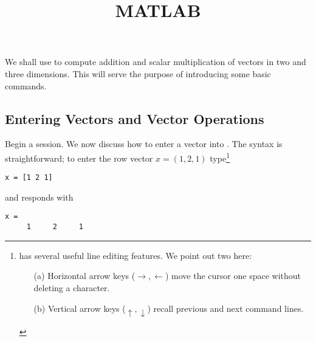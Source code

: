 \documentclass{ximera}
\title{MATLAB}
\begin{document}
\begin{abstract}
\end{abstract}
\maketitle


\label{S:1.2}

We shall use \Matlab to compute addition and scalar
multiplication of vectors in two and three dimensions.  This
will serve the purpose of introducing some basic \Matlab
commands.

\subsection*{Entering Vectors and Vector Operations}

Begin a \Matlab session.  We now discuss how to enter a vector
into \Matlabp.  The syntax is straightforward; to enter the row
vector $x=(1,2,1)$ type\footnote{\Matlab has several useful line
editing features.  We point out two here:
\begin{enumerate}
\item[(a)]	Horizontal arrow keys ($\rightarrow,\leftarrow$)
	move the cursor one space without deleting a character.
\item[(b)]	Vertical arrow keys ($\uparrow,\downarrow$)
	recall previous and next command lines.
\end{enumerate} }

\begin{verbatim}
x = [1 2 1]
\end{verbatim}
\index{\computer![1 2 1]} and \Matlab responds with
\begin{verbatim}
x =
     1     2     1
\end{verbatim}
\end{document}
